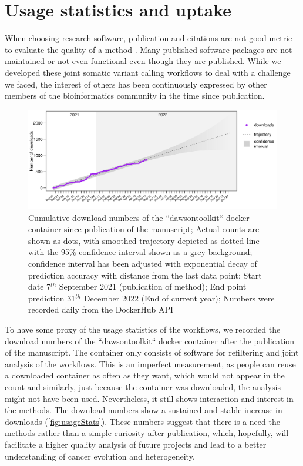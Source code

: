\section[Usage]{Usage statistics and uptake}
\label{variantcalling-sec:usage}
When choosing research software, publication and citations are not  good metric to evaluate the quality of a method \cite{Gardner2022}. Many published software packages are not maintained or not even functional even though they are published. While we developed these joint somatic variant calling workflows to deal with a challenge we faced, the interest of others has been continuously expressed by other members of the bioinformatics community  in the  time since publication.

\begin{figure}[!ht]
\centering
\includegraphics[width=.99\linewidth]{Figures/jointVariantCalling/dawsontoolkitDownloads.pdf}
\caption[Usage statistics joint workflows]{Cumulative download numbers of the ``dawsontoolkit`` docker container since publication of the manuscript; Actual counts are shown as dots, with smoothed trajectory depicted as dotted line with the 95\% confidence interval shown as a grey background; confidence interval has been adjusted with exponential decay of prediction accuracy with distance from the last data point; Start date 7$^{th}$ September 2021 (publication of method); End point prediction 31$^{th}$ December 2022 (End of current year); Numbers were recorded daily from the DockerHub API}\label{fig:usageStats}
\end{figure}

To have some proxy of the usage statistics of the workflows, we recorded the download numbers of the ``dawsontoolkit`` docker container after the publication of the manuscript. The container only consists of software for refiltering and joint analysis of the workflows. This is an imperfect measurement, as people can reuse a downloaded container as often as they want, which would not appear in the count and similarly, just because the container was downloaded, the analysis might not have been used. Nevertheless, it still shows interaction and interest in the methods. The download numbers show a sustained and stable increase in downloads (\autoref{fig:usageStats}). These numbers suggest that there is a need  the methods rather than a simple curiosity after publication, which, hopefully, will facilitate a higher quality analysis of future projects and lead to a better understanding of cancer evolution and heterogeneity.
